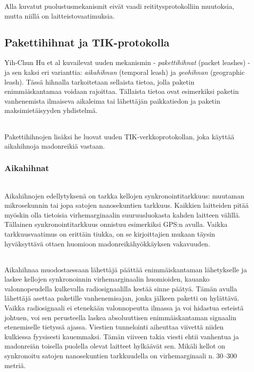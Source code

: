 \documentclass[finnish]{tktltiki2}
\theoremstyle{definition}
\theoremstyle{remark}
\begin{document}
Alla kuvatut puolustusmekanismit eivät vaadi reititysprotokolliin muutoksia, mutta niillä on laitteistovaatimuksia.

% 
% 
% 
% 
% 
% 
% 
% 

\subsection{Pakettihihnat ja TIK-protokolla}
\label{packetleashes}
% 
% 
% 
% 
% 
% 
% 
% 
% 
% 
Yih-Chun Hu et al \cite{leashes} kuvailevat uuden mekanismin - \emph{pakettihihnat} (packet leashes) - ja sen kaksi eri varianttia: \emph{aikahihnan} (temporal leash) ja \emph{geohihnan} (geographic leash). Tässä hihnalla tarkoitetaan sellaista tietoa, jolla paketin enimmäiskantamaa voidaan rajoittaa. Tällaista tietoa ovat esimerkiksi paketin vanhenemista ilmaiseva aikaleima tai lähettäjän paikkatiedon ja paketin maksimietäisyyden yhdistelmä.

\noindent \\
Pakettihihnojen lisäksi he luovat uuden TIK-verkkoprotokollan, joka käyttää aikahihnoja madonreikiä vastaan.

\subsubsection{Aikahihnat} 
\noindent \\
Aikahihnojen edellytyksenä on tarkka kellojen synkronointitarkkuus: muutaman mikrosekunnin tai jopa satojen nanosekuntien tarkkuus. Kaikkien laitteiden pitää myöskin olla tietoisia virhemarginaalin suuruusluokasta kahden laitteen välillä. Tällainen synkronointitarkkuus onnistuu esimerkiksi GPS:n avulla. Vaikka tarkkuusvaatimus on erittäin tiukka, on se kirjoittajien mukaan täysin hyväksyttävä ottaen huomioon madonreikähyökkäyksen vakavuuden.

\noindent \\
Aikahihnaa muodostaessaan lähettäjä päättää enimmäiskantaman lähetykselle ja laskee kellojen synkronoinnin virhemarginaalin huomioiden, kauanko valonnopeudella kulkevalla radiosignaalilla kestää sinne päätyä. Tämän avulla lähettäjä asettaa paketille vanhenemisajan, jonka jälkeen paketti on hylättävä. Vaikka radiosignaali ei etenekään valonnopeutta ilmassa ja voi hidastua esteistä johtuen, voi sen perusteella laskea absoluuttisen enimmäiskantaman signaalin etenemiselle tietyssä ajassa. Viestien tunnelointi aiheuttaa viivettä niiden kulkiessa fyysisesti kauemmaksi. Tämän viiveen takia viesti ehtii vanhentua ja madonreiän toisella puolella olevat laitteet hylkäävät sen. Mikäli kellot on synkronoitu satojen nanosekuntien tarkkuudella on virhemarginaali n. 30--300 metriä.
\end{document}
